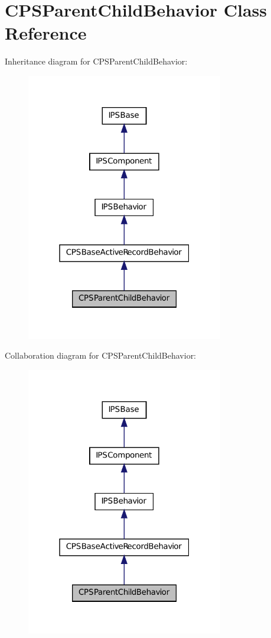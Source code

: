 \hypertarget{classCPSParentChildBehavior}{
\section{CPSParentChildBehavior Class Reference}
\label{classCPSParentChildBehavior}
}


Inheritance diagram for CPSParentChildBehavior:\nopagebreak
\begin{figure}[H]
\begin{center}
\leavevmode
\includegraphics[width=244pt]{classCPSParentChildBehavior__inherit__graph}
\end{center}
\end{figure}


Collaboration diagram for CPSParentChildBehavior:\nopagebreak
\begin{figure}[H]
\begin{center}
\leavevmode
\includegraphics[width=244pt]{classCPSParentChildBehavior__coll__graph}
\end{center}
\end{figure}
